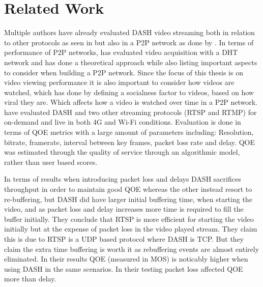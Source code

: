 \chapter{Related Work}
\label{cha:related-work}

Multiple authors have already evaluated \ac{DASH} video streaming both in relation to other protocols as seen in \citeauthor{aloman2015performance} but also in a \ac{P2P} network as done by \citeauthor{gazdar2017toward}. In terms of performance of \ac{P2P} networks, \citeauthor{nguyen2009p2p} has evaluated video acquisition with a \ac{DHT} network and \citeauthor{qiu2004modeling} has done a theoretical approach while also listing important aspects to consider when building a \ac{P2P} network. Since the focus of this thesis is on video viewing performance it is also important to consider how videos are watched, which \citeauthor{broxton2013catching} has done by defining a socialness factor to videos, based on how viral they are. Which affects how a video is watched over time in a \ac{P2P} network.
\\

\citeauthor{aloman2015performance} \cite{aloman2015performance} have evaluated \ac{DASH} and two other streaming protocols (\ac{RTSP} and \ac{RTMP}) for on-demand and live in both 4G and Wi-Fi conditions. Evaluation is done in terms of \ac{QOE} metrics with a large amount of parameters including: Resolution, bitrate, framerate, interval between key frames, packet loss rate and delay. \ac{QOE} was estimated through the quality of service through an algorithmic model, rather than user based scores.


In terms of results when introducing packet loss and delays \ac{DASH} sacrifices throughput in order to maintain good \ac{QOE} whereas the other instead resort to re-buffering, but \ac{DASH} did have larger initial buffering time, when starting the video, and as packet loss and delay increases more time is required to fill the buffer initially. They conclude that \ac{RTSP} is more efficient for starting the video initially but at the expense of packet loss in the video played stream. They claim this is due to \ac{RTSP} is a UDP based protocol where \ac{DASH} is TCP. But they claim the extra time buffering is worth it as rebuffering events are almost entirely eliminated. In their results \ac{QOE} (measured in MOS) is noticably higher when using \ac{DASH} in the same scenarios. In their testing packet loss affected \ac{QOE} more than delay.
\\


